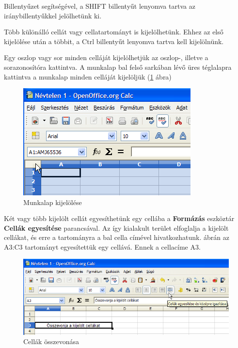 Billentyűzet segítségével, a SHIFT billentyűt lenyomva
tartva az iránybillentyűkkel jelölhetünk ki.

Több különálló cellát vagy cellatartományt is
kijelölhetünk. Ehhez az első kijelölése után a többit,
a Ctrl billentyűt lenyomva tartva kell kijelölnünk.

Egy oszlop vagy sor minden celláját kijelölhetjük az oszlop-,
illetve a sorazonosítóra kattintva. A munkalap bal felső
sarkában lévő üres téglalapra kattintva a munkalap minden
celláját kijelöljük (\ref{MunkalapKijelölés} ábra)

\begin{figure}[!h]
\begin{center}
\includegraphics[width=9.126cm]{oocalcv1-img9.png}
\caption{Munkalap kijelölése}\label{MunkalapKijelölés}
\end{center}
\end{figure}

Két vagy több kijelölt cellát egyesíthetünk egy cellába a
\textbf{Formázás} eszköztár \textbf{Cellák egyesítése}
parancsával. Az így kialakult terület elfoglalja a kijelölt
cellákat, és erre a tartományra a bal cella címével
hivatkozhatunk.  ábrán az A3:C3 tartományt
egyesítettük egy cellává. Ennek a cellacíme A3. 

\begin{figure}[!h]
\begin{center}
\includegraphics[width=15.999cm]{oocalcv1-img10.png}
\caption{Cellák összevonása}\label{CellákEgyesítése}
\end{center}
\end{figure}


